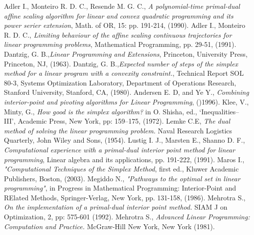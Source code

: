 \documentclass[a4paper,10 pt,titlepage,twoside]{book}
\theoremstyle{plain}
\theoremstyle{definition}
\theoremstyle{remark}
\begin{document}
\begin{thebibliography}{9}
	 Adler I., Monteiro R. D. C., Resende M. G. C., \emph{A polynomial-time primal-dual affine scaling algorithm for linear and convex quadratic programming and its power serier extension}, Math. of OR, 15: pp. 191-214, (1990).
	 Adler I., Monteiro R. D. C., \emph{Limiting behaviour of the affine scaling continuous trajectories for linear programming problems}, Mathematical Programming, pp. 29-51, (1991).
	Dantzig, G. B.,\emph{\;Linear Programming and Extensions}, Princeton, University Press, Princeton, NJ, (1963).
	Dantzig, G. B.,\emph{\;Expected number of steps of the simplex method for a linear program with a convexity constraint.}, Technical Report SOL 80-3, Systems Optimization Laboratory, Department of Operations Research, Stanford University, Stanford, CA, (1980).
	 Andersen E. D, and Ye Y.,  \textit{Combining interior-point and pivoting algorithms for Linear Programming}, ()1996).
		 Klee, V., Minty, G., \emph{ How good is the simplex algorithm? } in O. Shisha, ed.,
	‘Inequalities–III’, Academic Press, New York, pp: 159–175, (1972).
	 Lemke C.E, \textit{ The dual method of solving the linear programming problem.} Naval Research Logistics Quarterly, John Wiley and Sons, (1954).
		 Lustig I. J., Marsten E., Shanno D. F., \emph{ Computational experience with a primal-dual interior point method for linear programming}, Linear algebra and its applications, pp. 191-222, (1991).
		 Maros I., \emph{ "Computational Techniques of the Simplex Method}, first ed., Kluwer
		Academic Publishers, Boston, (2003).
		 Megiddo N., \emph{ "Pathways to the optimal set in linear programming"}, in Progress in Mathematical Programming: Interior-Point and RElated Methods, Springer-Verlag, New York, pp. 131-158, (1986).
	 Mehrotra S., \emph{ On the implementation of a primal-dual interior point method. } SIAM J on Optimization, 2, pp: 575-601 (1992).
	 Mehrotra S., \emph{ Advanced Linear Programming: Computation and
	Practice. } McGraw-Hill New York, New York (1981).


\end{thebibliography}
\end{document}
